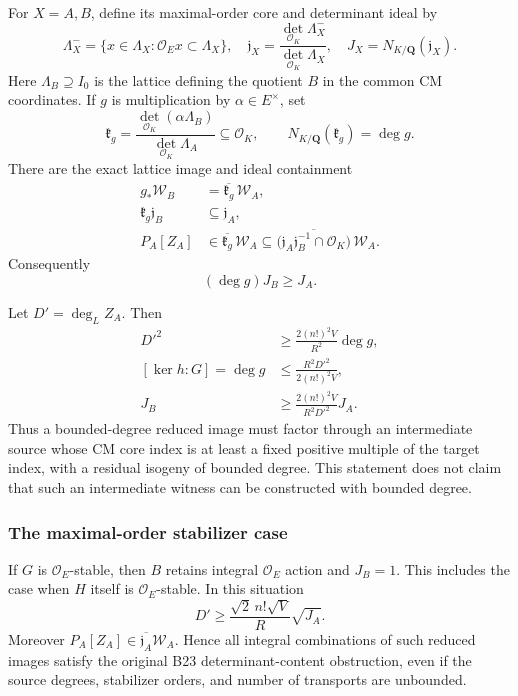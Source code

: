 For \(X=A,B\), define its maximal-order core and determinant ideal by \[
 \Lambda_X^-=\{x\in\Lambda_X:\mathcal O_E x\subset\Lambda_X\},
 \quad
 \mathfrak j_X=\frac{\det_{\mathcal O_K}\Lambda_X^-}
                     {\det_{\mathcal O_K}\Lambda_X},
 \quad J_X=N_{K/\mathbf Q}(\mathfrak j_X).
\] Here \(\Lambda_B\supseteq I_0\) is the lattice defining the quotient \(B\) in the common CM coordinates. If \(g\) is multiplication by \(\alpha\in E^\times\), set \[
 \mathfrak k_g=
 \frac{\det_{\mathcal O_K}(\alpha\Lambda_B)}
      {\det_{\mathcal O_K}\Lambda_A}\subseteq\mathcal O_K,
 \qquad N_{K/\mathbf Q}(\mathfrak k_g)=\deg g.
\tag{B25.4}
\] There are the exact lattice image and ideal containment \[
 \begin{aligned}
 g_*\mathscr W_B&=\overline{\mathfrak k_g}\,\mathscr W_A,\\
 \mathfrak k_g\mathfrak j_B&\subseteq\mathfrak j_A,\\
 P_A[Z_A]&\in\overline{\mathfrak k_g}\,\mathscr W_A
 \subseteq
 \overline{\bigl(\mathfrak j_A\mathfrak j_B^{-1}
                         \cap\mathcal O_K\bigr)}\,\mathscr W_A.
 \end{aligned}
\tag{B25.5}
\] Consequently \[
 (\deg g)J_B\ge J_A.
\tag{B25.6}
\]

Let \(D'=\deg_L Z_A\). Then \[
 \begin{aligned}
 D'^2&\ge \frac{2(n!)^2V}{R^2}\deg g,\\
 [\ker h:G]=\deg g
 &\le\frac{R^2D'^2}{2(n!)^2V},\\
 J_B&\ge\frac{2(n!)^2V}{R^2D'^2}J_A.
 \end{aligned}
\tag{B25.7}
\] Thus a bounded-degree reduced image must factor through an intermediate source whose CM core index is at least a fixed positive multiple of the target index, with a residual isogeny of bounded degree. This statement does not claim that such an intermediate witness can be constructed with bounded degree.

\subsubsection{The maximal-order stabilizer case}\label{the-maximal-order-stabilizer-case}

If \(G\) is \(\mathcal O_E\)-stable, then \(B\) retains integral \(\mathcal O_E\) action and \(J_B=1\). This includes the case when \(H\) itself is \(\mathcal O_E\)-stable. In this situation \[
 D'\ge\frac{\sqrt2\,n!\sqrt V}{R}\sqrt{J_A}.
\tag{B25.8}
\] Moreover \(P_A[Z_A]\in\overline{\mathfrak j_A}\mathscr W_A\). Hence all integral combinations of such reduced images satisfy the original B23 determinant-content obstruction, even if the source degrees, stabilizer orders, and number of transports are unbounded.

